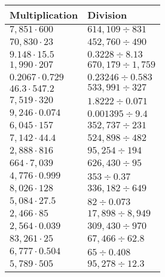 \begin{longtable}[]{@{}ll@{}}
\toprule
Multiplication & Division\tabularnewline
\midrule
\endhead
\(7,851\cdot600\) & \(614,109÷831\)\tabularnewline
\(70,830\cdot23\) & \(452,760÷490\)\tabularnewline
\(9.148\cdot15.5\) & \(0.3228÷8.13\)\tabularnewline
\(1,990\cdot207\) & \(670,179÷1,759\)\tabularnewline
\(0.2067\cdot0.729\) & \(0.23246÷0.583\)\tabularnewline
\(46.3\cdot547.2\) & \(533,991÷327\)\tabularnewline
\(7,519\cdot320\) & \(1.8222÷0.071\)\tabularnewline
\(9,246\cdot0.074\) & \(0.001395÷9.4\)\tabularnewline
\(6,045\cdot157\) & \(352,737÷231\)\tabularnewline
\(7,142\cdot44.4\) & \(524,898÷482\)\tabularnewline
\(2,888\cdot816\) & \(95,254÷194\)\tabularnewline
\(664\cdot7,039\) & \(626,430÷95\)\tabularnewline
\(4,776\cdot0.999\) & \(353÷0.37\)\tabularnewline
\(8,026\cdot128\) & \(336,182÷649\)\tabularnewline
\(5,084\cdot27.5\) & \(82÷0.073\)\tabularnewline
\(2,466\cdot85\) & \(17,898÷8,949\)\tabularnewline
\(2,564\cdot0.039\) & \(309,430÷970\)\tabularnewline
\(83,261\cdot25\) & \(67,466÷62.8\)\tabularnewline
\(6,777\cdot0.504\) & \(65÷0.408\)\tabularnewline
\(5,789\cdot505\) & \(95,278÷12.3\)\tabularnewline
\bottomrule
\end{longtable}
